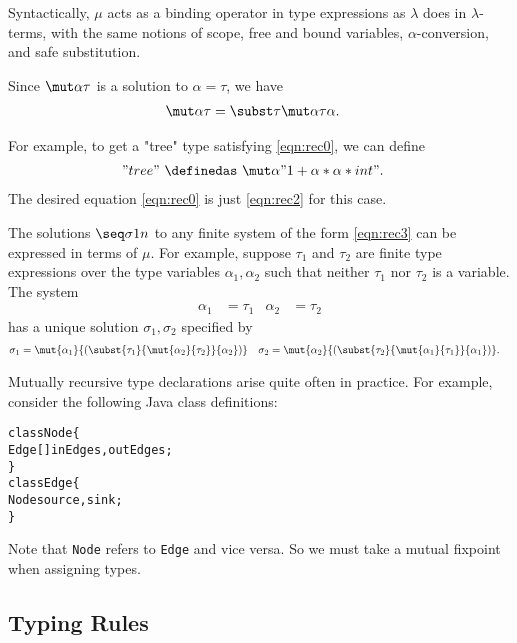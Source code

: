 Syntactically, $\mu$ acts as a binding operator in type expressions as $\lambda$ does in $\lambda$-terms, with the same notions of scope, free and bound variables, $\alpha$-conversion, and safe substitution.

Since $\mut\alpha\tau$ is a solution to $\alpha=\tau$, we have
\begin{align}
\mut\alpha\tau &= \subst\tau{\mut\alpha\tau}\alpha.\label{eqn:rec2}
\end{align}

For example, to get a "tree" type satisfying \eqref{eqn:rec0}, we can define
\begin{align*}
"tree"\ &\definedas\ \mut\alpha{"1 + \alpha * \alpha * int"}.
\end{align*}
The desired equation \eqref{eqn:rec0} is just \eqref{eqn:rec2} for this case.

The solutions $\seq\sigma 1n$ to any finite system of the form \eqref{eqn:rec3} can be expressed in terms of $\mu$. For example, suppose $\tau_1$ and $\tau_2$ are finite type expressions over the type variables $\alpha_1,\alpha_2$ such that neither $\tau_1$ nor $\tau_2$ is a variable. The system
\begin{align*}
\alpha_1 &= \tau_1 & \alpha_2 &= \tau_2
\end{align*}
has a unique solution $\sigma_1,\sigma_2$ specified by
\begin{align*}
\sigma_1 &= \mut{\alpha_1}{(\subst{\tau_1}{\mut{\alpha_2}{\tau_2}}{\alpha_2})} &
\sigma_2 &= \mut{\alpha_2}{(\subst{\tau_2}{\mut{\alpha_1}{\tau_1}}{\alpha_1})}.
\end{align*}

Mutually recursive type declarations arise quite often in practice. For example, consider the following Java class definitions:
\begin{small}
\begin{alltt}
   class Node \{
     Edge[] inEdges, outEdges;
   \}
   class Edge \{
     Node source, sink;
   \}
\end{alltt}
\end{small}
Note that \texttt{Node} refers to \texttt{Edge} and vice versa. So we must take a mutual fixpoint when assigning types.

\subsection{Typing Rules}

